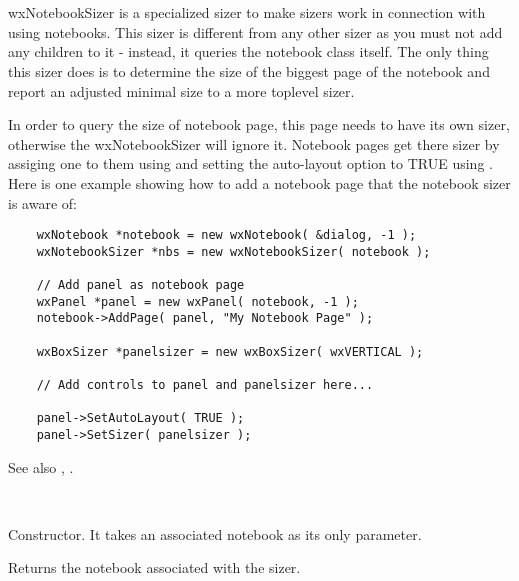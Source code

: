 \section{}\label{wxnotebooksizer}

wxNotebookSizer is a specialized sizer to make sizers work in connection
with using notebooks. This sizer is different from any other sizer as 
you must not add any children to it - instead, it queries the notebook class itself.
The only thing this sizer does is to determine the size of the biggest
page of the notebook and report an adjusted minimal size to a more toplevel
sizer.

In order to query the size of notebook page, this page needs to have its
own sizer, otherwise the wxNotebookSizer will ignore it. Notebook pages
get there sizer by assiging one to them using  
and setting the auto-layout option to TRUE using 
. Here is one
example showing how to add a notebook page that the notebook sizer is
aware of:

\begin{verbatim}
    wxNotebook *notebook = new wxNotebook( &dialog, -1 );
    wxNotebookSizer *nbs = new wxNotebookSizer( notebook );

    // Add panel as notebook page
    wxPanel *panel = new wxPanel( notebook, -1 );
    notebook->AddPage( panel, "My Notebook Page" );

    wxBoxSizer *panelsizer = new wxBoxSizer( wxVERTICAL );

    // Add controls to panel and panelsizer here...

    panel->SetAutoLayout( TRUE );
    panel->SetSizer( panelsizer );
\end{verbatim}

See also , .


\\


\label{wxnotebooksizerwxnotebooksizer}


Constructor. It takes an associated notebook as its only parameter.

\label{wxnotebooksizergetnotebook}


Returns the notebook associated with the sizer.

